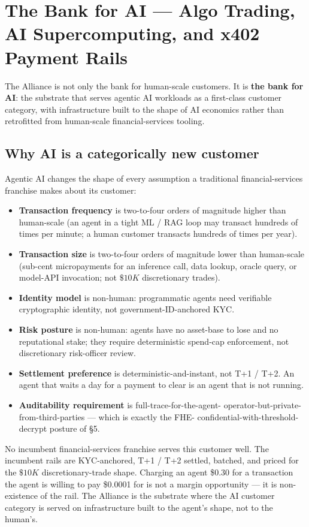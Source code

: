 \section{The Bank for AI --- Algo Trading, AI Supercomputing, and x402 Payment Rails}

The Alliance is not only the bank for human-scale customers. It is
\textbf{the bank for AI}: the substrate that serves agentic AI workloads
as a first-class customer category, with infrastructure built to the
shape of AI economics rather than retrofitted from human-scale
financial-services tooling.

\subsection{Why AI is a categorically new customer}

Agentic AI changes the shape of every assumption a traditional
financial-services franchise makes about its customer:

\begin{itemize}[leftmargin=2em,itemsep=0.1em]
\item \textbf{Transaction frequency} is two-to-four orders of magnitude
higher than human-scale (an agent in a tight ML / RAG loop may transact
hundreds of times per minute; a human customer transacts hundreds of
times per year).
\item \textbf{Transaction size} is two-to-four orders of magnitude
lower than human-scale (sub-cent micropayments for an inference call,
data lookup, oracle query, or model-API invocation; not $\$10K$
discretionary trades).
\item \textbf{Identity model} is non-human: programmatic agents need
verifiable cryptographic identity, not government-ID-anchored KYC.
\item \textbf{Risk posture} is non-human: agents have no asset-base
to lose and no reputational stake; they require deterministic
spend-cap enforcement, not discretionary risk-officer review.
\item \textbf{Settlement preference} is deterministic-and-instant, not
T+1 / T+2. An agent that waits a day for a payment to clear is an
agent that is not running.
\item \textbf{Auditability requirement} is full-trace-for-the-agent-
operator-but-private-from-third-parties --- which is exactly the FHE-
confidential-with-threshold-decrypt posture of \S 5.
\end{itemize}

No incumbent financial-services franchise serves this customer well.
The incumbent rails are KYC-anchored, T+1 / T+2 settled, batched, and
priced for the $\$10K$ discretionary-trade shape. Charging an agent
\$0.30 for a transaction the agent is willing to pay \$0.0001 for is
not a margin opportunity --- it is non-existence of the rail. The
Alliance is the substrate where the AI customer category is served on
infrastructure built to the agent's shape, not to the human's.

